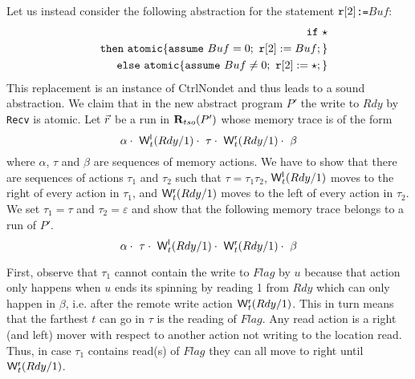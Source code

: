 Let us instead consider the following abstraction for the statement {\tt $\mathtt{r}[2]$:=$Buf$}:
\begin{eqnarray*}
&&\mathtt{if}\ {\star}\\
&&\mathtt{then}\ \mathtt{atomic}\{\mathtt{assume}\ Buf=0;\ \mathtt{r}[2]:=Buf;\}\\
&&\mathtt{else}\ \mathtt{atomic}\{\mathtt{assume}\ Buf\neq0;\ \mathtt{r}[2]:=\star;\}
\end{eqnarray*}
This replacement is an instance of {\sc\small CtrlNondet} and thus leads to a sound abstraction.
We claim that in the new abstract program $P'$ the write to $Rdy$ by {\tt Recv} is atomic.
Let $\vec{r}$ be a run in $\mathbf{R}_{tso}(P')$ whose memory trace is of the form
\[
\alpha\cdot\ \mathsf{W}^{\mathsf{l}}_{t}(Rdy/1)\cdot\ \tau\cdot\ \mathsf{W}^{\mathsf{r}}_{t}(Rdy/1)\cdot\ \beta
\]
where $\alpha$, $\tau$ and $\beta$ are sequences of memory actions.
We have to show that there are sequences of actions $\tau_1$ and $\tau_2$ such that $\tau=\tau_1\tau_2$, $\mathsf{W}^{\mathsf{l}}_{t}(Rdy/1)$ moves to the right of every action in $\tau_1$, and $\mathsf{W}^{\mathsf{r}}_{t}(Rdy/1)$ moves to the left of every action in $\tau_2$. 
We set $\tau_1=\tau$ and $\tau_2=\varepsilon$ and show that the following memory trace belongs to a run of $P'$.
\[
\alpha\cdot\ \tau\cdot\ \mathsf{W}^{\mathsf{l}}_{t}(Rdy/1)\cdot\ \mathsf{W}^{\mathsf{r}}_{t}(Rdy/1)\cdot\ \beta
\]

First, observe that $\tau_1$ cannot contain the write to $Flag$ by $u$ because that action only happens when $u$ ends its spinning by reading 1 from $Rdy$ which can only happen in $\beta$, i.e. after the remote write action $\mathsf{W}^{\mathsf{r}}_{t}(Rdy/1)$.
This in turn means that the farthest $t$ can go in $\tau$ is the reading of $Flag$.
Any read action is a right (and left) mover with respect to another action not writing to the location read.
Thus, in case $\tau_1$ contains read(s) of $Flag$ they can all move to right until $\mathsf{W}^{\mathsf{r}}_{t}(Rdy/1)$.

